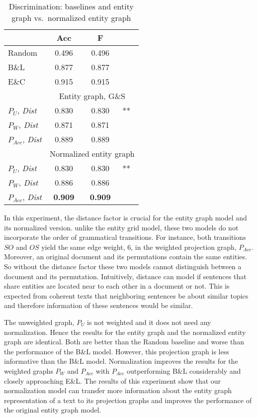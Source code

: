 \begin{table}[!t]
\centering
\begin{small}
\begin{tabular}{l|cc@{}l}
& Acc & F &\\\hline
Random & 0.496 & 0.496 & \\
B\&L & 0.877 & 0.877 &\\ 
E\&C & 0.915 & 0.915  &\\\hline

& \multicolumn{3}{|c}{Entity graph, G\&S} \\\hline 
$P_U$, \textit{Dist} & 0.830 & 0.830 & ** \\
$P_W$, \textit{Dist} & 0.871 & 0.871& \\
$P_{Acc}$, \textit{Dist} & 0.889 & 0.889& \\\hline

& \multicolumn{3}{|c}{Normalized entity graph} \\\hline 
$P_U$, \textit{Dist} & 0.830 & 0.830& ** \\
$P_W$, \textit{Dist} & 0.886 & 0.886&\\
$P_{Acc}$, \textit{Dist} & \textbf{0.909} & \textbf{0.909}&\\
\end{tabular}
\end{small}
\caption{Discrimination: baselines and entity graph vs.\ normalized
  entity graph}\label{t:exp1:sentence_ordering}  
\end{table}
%
In this experiment, the distance factor is crucial for the entity graph model and its normalized version. 
unlike the entity grid model, these two models do not incorporate the order of grammatical transitions. 
For instance, both transitions $S O$ and $O S$ yield the same edge weight, $6$, in the weighted projection graph, $P_{Acc}$. 
Moreover, an original document and its permutations contain the same entities. 
So without the distance factor these two models cannot distinguish between a document and its permutation. 
Intuitively, distance can model if sentences that share entities are located near to each other in a document or not. 
This is expected from coherent texts that neighboring sentences be about similar topics and therefore information of these sentences would be similar. 

The unweighted graph, $P_U$ is not weighted and it does not need any normalization.  
Hence the results for the entity graph and the normalized entity graph are identical.
Both are better than the Random baseline and worse than the performance of the B\&L model.
However, this projection graph is less informative than the B\&L model. 
Normalization improves the results for the weighted graphs $P_W$ and $P_{Acc}$ with $P_{Acc}$ outperforming B\&L
considerably and closely approaching E\&L. 
The results of this experiment show that our normalization model can transfer more information about the entity graph representation of a text to its projection graphs and improves the performance of the original entity graph model. 

